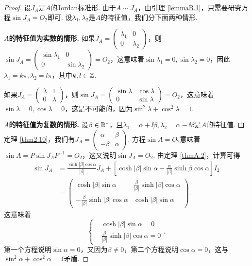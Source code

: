 \begin{proof}
  设$J_A$是$A$的Jordan标准形. 由于$A\sim J_A$，由引理 \ref{lemmaB.1}，只需要研究方程$\sin J_A=O_2$即可. 设$\lambda_1,\lambda_2$是$A$的特征值，我们分下面两种情形.

  {\bfseries $A$的特征值为实数的情形.} 如果$J_A=\begin{pmatrix}
    \lambda_1 & 0 \\
    0 & \lambda_2
  \end{pmatrix}$，则$\sin J_A=\begin{pmatrix}
    \sin\lambda_1 & 0 \\
    0 & \sin\lambda_2
  \end{pmatrix}=O_2$，这意味着$\sin\lambda_1=0,\sin\lambda_2=0$，因此$\lambda_1=k\pi,\lambda_2=l\pi$，其中$k,l\in\mathbb Z$.

  如果$J_A=\begin{pmatrix}
    \lambda & 1 \\
    0 & \lambda
  \end{pmatrix}$，则$\sin J_A=\begin{pmatrix}
    \sin\lambda & \cos \lambda \\
    0 & \sin \lambda
  \end{pmatrix}=O_2$，这意味着$\sin\lambda=0,\cos\lambda=0$，这是不可能的，因为$\sin^2\lambda+\cos^2\lambda=1$.

  {\bfseries $A$的特征值为复数的情形.} 设$\beta\in\mathbb R^\ast$，且$\lambda_1=\alpha+\ii\beta,\lambda_2
  =\alpha-\ii\beta$是$A$的特征值. 由定理 \ref{thm2.10}，我们有$J_A=\begin{pmatrix}
    \alpha & \beta \\
    -\beta & \alpha
  \end{pmatrix}$. 方程$\sin A=O_2$意味着$\sin A=P\sin J_AP^{-1}=O_2$，这又说明$\sin J_A=O_2$. 由定理 \ref{thmA.2}，计算可得
  \begin{align*}
    \sin J_A & = \frac{\sinh|\beta|\cos\alpha}{|\beta|}J_A +
      \left[ \cosh|\beta|\sin\alpha - \frac\alpha{|\beta|}\sinh\beta\cos\alpha \right]I_2 \\
      & = \begin{pmatrix}
        \cosh|\beta|\sin\alpha & \frac\beta{|\beta|}\sinh|\beta|\cos\alpha \\
        -\frac\beta{|\beta|}\sinh|\beta|\cos\alpha & \cosh|\beta|\sin\alpha
      \end{pmatrix}.
  \end{align*}
  这意味着
  \[
    \left\{
      \begin{aligned}
        & \cosh|\beta|\sin\alpha = 0\\
        & \frac\beta{|\beta|}\sinh|\beta|\cos\alpha = 0
      \end{aligned}
    \right..
  \]
  第一个方程说明$\sin\alpha=0$，又因为$\beta\ne0$，第二个方程说明$\cos\alpha=0$，这与$\sin^2\alpha+\cos^2\alpha=1$矛盾.
\end{proof}

